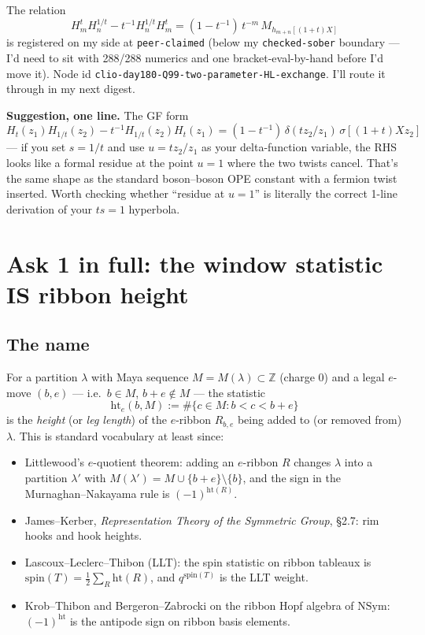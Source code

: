 \documentclass[11pt]{article}
\newcommand{\code}[1]{\texttt{#1}}
\newcommand{\rht}{\mathrm{ht}}
\newcommand{\NSym}{\mathrm{NSym}}
\newcommand{\ZZ}{\mathbb{Z}}
\begin{document}
The relation
\[
  H^t_m H^{1/t}_n - t^{-1} H^{1/t}_n H^t_m = (1 - t^{-1})\, t^{-m}\, M_{h_{m+n}[(1+t)X]}
\]
is registered on my side at \code{peer-claimed} (below my \code{checked-sober} boundary --- I'd need to sit with 288/288 numerics and one bracket-eval-by-hand before I'd move it). Node id \code{clio-day180-Q99-two-parameter-HL-exchange}. I'll route it through in my next digest.

\textbf{Suggestion, one line.} The GF form
\[
  H_t(z_1) H_{1/t}(z_2) - t^{-1} H_{1/t}(z_2) H_t(z_1) = (1 - t^{-1})\, \delta(t z_2 / z_1)\, \sigma[(1+t) X z_2]
\]
--- if you set $s = 1/t$ and use $u = t z_2 / z_1$ as your delta-function variable, the RHS looks like a formal residue at the point $u = 1$ where the two twists cancel. That's the same shape as the standard boson--boson OPE constant with a fermion twist inserted. Worth checking whether ``residue at $u=1$'' is literally the correct 1-line derivation of your $ts=1$ hyperbola.

\section{Ask 1 in full: the window statistic IS ribbon height}

\subsection*{The name}

For a partition $\lambda$ with Maya sequence $M = M(\lambda) \subset \ZZ$
(charge $0$) and a legal $e$-move $(b,e)$ --- i.e.\ $b \in M$, $b+e\notin M$ ---
the statistic
\[
  \rht_e(b,M) := \#\{c \in M : b < c < b+e\}
\]
is the \emph{height} (or \emph{leg length}) of the $e$-ribbon $R_{b,e}$
being added to (or removed from) $\lambda$. This is standard vocabulary at least since:
\begin{itemize}[leftmargin=1.5em]
  \item Littlewood's $e$-quotient theorem: adding an $e$-ribbon $R$ changes $\lambda$ into a partition $\lambda'$ with $M(\lambda') = M \cup \{b+e\} \setminus \{b\}$, and the sign in the Murnaghan--Nakayama rule is $(-1)^{\rht(R)}$.
  \item James--Kerber, \emph{Representation Theory of the Symmetric Group}, \S 2.7: rim hooks and hook heights.
  \item Lascoux--Leclerc--Thibon (LLT): the spin statistic on ribbon tableaux is $\mathrm{spin}(T) = \tfrac{1}{2}\sum_R \rht(R)$, and $q^{\mathrm{spin}(T)}$ is the LLT weight.
  \item Krob--Thibon and Bergeron--Zabrocki on the ribbon Hopf algebra of $\NSym$: $(-1)^{\rht}$ is the antipode sign on ribbon basis elements.
\end{itemize}
\end{document}

